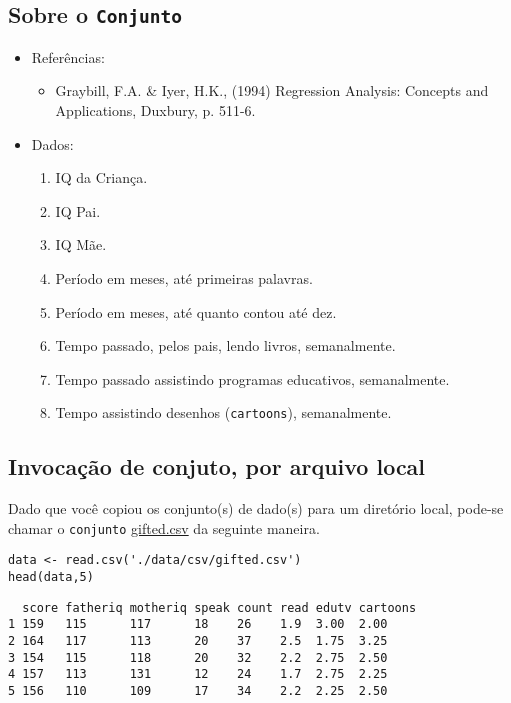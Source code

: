 \documentclass[12pt]{abntex2}
\begin{document}
\subsection{Sobre o \texttt{Conjunto}}
\label{sec:org325f960}
\begin{itemize}
\item Referências:
\begin{itemize}
\item Graybill, F.A. \& Iyer, H.K., (1994) Regression Analysis: Concepts and Applications, Duxbury, p. 511-6.
\end{itemize}
\item Dados:
\begin{enumerate}
\item IQ da Criança.
\item IQ Pai.
\item IQ Mãe.
\item Período em meses, até primeiras palavras.
\item Período em meses, até quanto contou até dez.
\item Tempo passado, pelos pais, lendo livros, semanalmente.
\item Tempo passado assistindo programas educativos, semanalmente.
\item Tempo assistindo desenhos (\texttt{cartoons}), semanalmente.
\end{enumerate}
\end{itemize}

\subsection{Invocação de conjuto, por arquivo local}
\label{sec:orgdc56965}

Dado que você copiou os conjunto(s) de dado(s) para um diretório
local, pode-se chamar o \texttt{conjunto} \href{https://drive.google.com/file/d/1stukrpc\_Rqu-nlYZu\_-BFHNZec676\_BR/view?usp=sharing}{gifted.csv} da seguinte maneira.

\begin{verbatim}
data <- read.csv('./data/csv/gifted.csv')
head(data,5)
\end{verbatim}

\begin{verbatim}
  score fatheriq motheriq speak count read edutv cartoons
1 159   115      117      18    26    1.9  3.00  2.00    
2 164   117      113      20    37    2.5  1.75  3.25    
3 154   115      118      20    32    2.2  2.75  2.50    
4 157   113      131      12    24    1.7  2.75  2.25    
5 156   110      109      17    34    2.2  2.25  2.50    
\end{verbatim}
\end{document}

